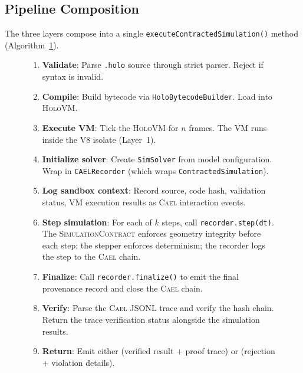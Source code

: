 \documentclass[letterpaper,twocolumn,10pt]{article}
\newcommand{\cael}{\textsc{Cael}}
\newcommand{\simcontract}{\textsc{SimulationContract}}
\newcommand{\holovm}{\textsc{HoloVM}}
\begin{document}
\subsection{Pipeline Composition}

The three layers compose into a single \texttt{executeContractedSimulation()}
method (Algorithm~\ref{alg:pipeline}).

\begin{figure}[t]
\centering
\begin{minipage}{0.95\columnwidth}
\small
\begin{enumerate}[leftmargin=*,topsep=2pt,itemsep=1pt]
  \item \textbf{Validate}: Parse \texttt{.holo} source through strict parser.
    Reject if syntax is invalid.
  \item \textbf{Compile}: Build bytecode via \texttt{HoloBytecodeBuilder}.
    Load into \holovm{}.
  \item \textbf{Execute VM}: Tick the \holovm{} for $n$ frames. The VM
    runs inside the V8 isolate (Layer~1).
  \item \textbf{Initialize solver}: Create \texttt{SimSolver} from model
    configuration. Wrap in \texttt{CAELRecorder} (which wraps
    \texttt{ContractedSimulation}).
  \item \textbf{Log sandbox context}: Record source, code hash,
    validation status, VM execution results as \cael{} interaction events.
  \item \textbf{Step simulation}: For each of $k$ steps, call
    \texttt{recorder.step(dt)}. The \simcontract{} enforces geometry
    integrity before each step; the stepper enforces determinism; the
    recorder logs the step to the \cael{} chain.
  \item \textbf{Finalize}: Call \texttt{recorder.finalize()} to emit
    the final provenance record and close the \cael{} chain.
  \item \textbf{Verify}: Parse the \cael{} JSONL trace and verify the
    hash chain. Return the trace verification status alongside the
    simulation results.
  \item \textbf{Return}: Emit either (verified result + proof trace)
    or (rejection + violation details).
\end{enumerate}
\end{minipage}
\label{alg:pipeline}
\end{figure}
\end{document}
